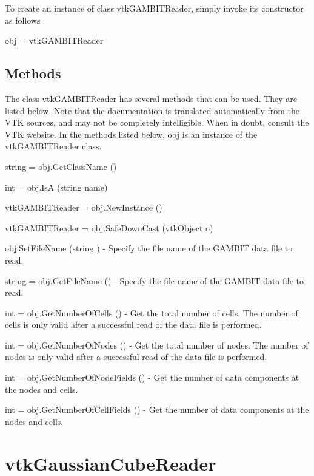 To create an instance of class vtk\-G\-A\-M\-B\-I\-T\-Reader, simply invoke its constructor as follows \begin{DoxyVerb}  obj = vtkGAMBITReader
\end{DoxyVerb}
 \hypertarget{vtkwidgets_vtkxyplotwidget_Methods}{}\subsection{Methods}\label{vtkwidgets_vtkxyplotwidget_Methods}
The class vtk\-G\-A\-M\-B\-I\-T\-Reader has several methods that can be used. They are listed below. Note that the documentation is translated automatically from the V\-T\-K sources, and may not be completely intelligible. When in doubt, consult the V\-T\-K website. In the methods listed below, {\ttfamily obj} is an instance of the vtk\-G\-A\-M\-B\-I\-T\-Reader class. 
\begin{DoxyItemize}
\item {\ttfamily string = obj.\-Get\-Class\-Name ()}  
\item {\ttfamily int = obj.\-Is\-A (string name)}  
\item {\ttfamily vtk\-G\-A\-M\-B\-I\-T\-Reader = obj.\-New\-Instance ()}  
\item {\ttfamily vtk\-G\-A\-M\-B\-I\-T\-Reader = obj.\-Safe\-Down\-Cast (vtk\-Object o)}  
\item {\ttfamily obj.\-Set\-File\-Name (string )} -\/ Specify the file name of the G\-A\-M\-B\-I\-T data file to read.  
\item {\ttfamily string = obj.\-Get\-File\-Name ()} -\/ Specify the file name of the G\-A\-M\-B\-I\-T data file to read.  
\item {\ttfamily int = obj.\-Get\-Number\-Of\-Cells ()} -\/ Get the total number of cells. The number of cells is only valid after a successful read of the data file is performed.  
\item {\ttfamily int = obj.\-Get\-Number\-Of\-Nodes ()} -\/ Get the total number of nodes. The number of nodes is only valid after a successful read of the data file is performed.  
\item {\ttfamily int = obj.\-Get\-Number\-Of\-Node\-Fields ()} -\/ Get the number of data components at the nodes and cells.  
\item {\ttfamily int = obj.\-Get\-Number\-Of\-Cell\-Fields ()} -\/ Get the number of data components at the nodes and cells.  
\end{DoxyItemize}\hypertarget{vtkio_vtkgaussiancubereader}{}\section{vtk\-Gaussian\-Cube\-Reader}\label{vtkio_vtkgaussiancubereader}

